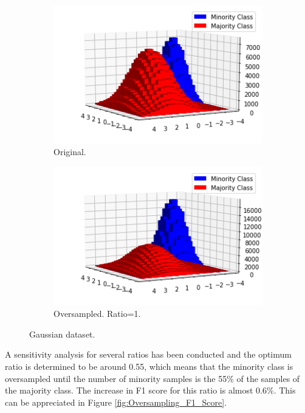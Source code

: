 \documentclass[conference]{IEEEtran}
\begin{document}
	
		\begin{figure}[h]
		\centering
		\begin{subfigure}[h]{0.24\textwidth}
			\centering
			\includegraphics[width=\textwidth]{Oversampling_2D_OriginalDataset}
			\caption{Original.}
			\label{fig:Oversampling_2D_OriginalDataset}
		\end{subfigure}
		\hfill
		\begin{subfigure}[h]{0.24\textwidth}
			\centering
			\includegraphics[width=\textwidth]{Oversampling_2D_OversampledDataset}
			\caption{Oversampled. Ratio=1.}
			\label{fig:Oversampling_2D_OversampledDataset}
		\end{subfigure}
		\caption{Gaussian dataset.}
		\label{fig:Oversampling_2D_OriginalHistograms}
	\end{figure}
	
	A sensitivity analysis for several ratios has been conducted and the optimum ratio is determined to be around 0.55, which means that the minority class is oversampled until the number of minority samples is the 55\% of the samples of the majority class. The increase in F1 score for this ratio is almost 0.6\%. This can be appreciated in Figure \ref{fig:Oversampling_F1_Score}. 
	
\end{document}
